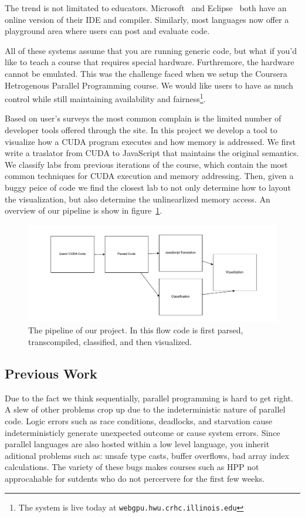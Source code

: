 \documentclass[nocopyrightspace]{sigchi}
\begin{document}
The trend is not limitated to educators. Microsoft~\cite{1_visualstudio.com_2014} and Eclipse~\cite{orion} both have an online
version of their IDE and compiler. Similarly, most languages now offer a playground area
where users can post and evaluate code.

All of these systems assume that you are running generic code, but what if you'd like
to teach a course that requires special hardware. Furthremore, the hardware cannot be
emulated. This was the challenge faced when we setup the Coursera Hetrogenous Parallel
Programming course. We would like users to have as much control while still maintaining
availability and fairness\footnote{The system is live today at {\tt webgpu.hwu.crhc.illinois.edu}}. 

Based on user's surveys the most common complain is the limited number of developer tools
offered through the site. In this project we develop a tool to visualize how a CUDA
program executes and how memory is addressed. We first write a traslator from 
CUDA to JavaScript that maintains the original semantics.
We classify labs from previous iterations of the course, which contain the most
common techniques for CUDA execution and 
memory addressing. Then, given a buggy peice of code we find the closest lab to 
not only determine how to layout the visualization, but also determine the 
unlinearlized memory access.
An overview of our pipeline is show in figure~\ref{fig:pipeline}.

\begin{figure}[!h]
\centering
\includegraphics[width=0.9\columnwidth]{flow}
\caption{The pipeline of our project. In this flow code is first
parsed, transcompiled, classified, and then visualized.}
\label{fig:pipeline}
\end{figure}

\subsection{Previous Work}


Due to the fact we think sequentially, parallel programming is hard to get
right. A slew of other problems crop up due to the  indeterministic nature of
parallel code. Logic errors such as race conditions, deadlocks, and starvation
cause indeterministicly generate unexpected outcome or cause system errors.
Since parallel languages are also hosted within a low level language,
you inherit aditional problems such as: unsafe type casts, buffer overflows,
bad array index calculations. The variety of these bugs makes courses such 
as HPP not approcahable for sutdents who do not percervere for the first few 
weeks.
\end{document}
